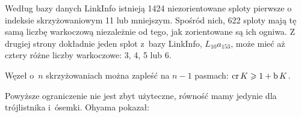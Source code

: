 Według bazy danych LinkInfo \cite{linkinfo24} istnieją 1424 niezorientowane sploty pierwsze o indeksie skrzyżowaniowym 11 lub mniejszym.
Spośród nich, 622 sploty mają tę samą liczbę warkoczową niezależnie od tego, jak zorientowane są ich ogniwa.   
Z drugiej strony dokładnie jeden splot z~bazy LinkInfo, $L_{10}a_{153}$, może mieć aż cztery różne liczby warkoczowe: 3, 4, 5 lub 6.

\begin{proposition}
    Węzeł o~$n$ skrzyżowaniach można zapleść na $n - 1$ pasmach: $\operatorname{cr} K \geqslant 1 + \operatorname{b} K$.
\end{proposition}

Powyższe ograniczenie nie jest zbyt użyteczne, równość mamy jedynie dla trójlistnika i~ósemki.
Ohyama \cite{ohyama1993} pokazał:
%

